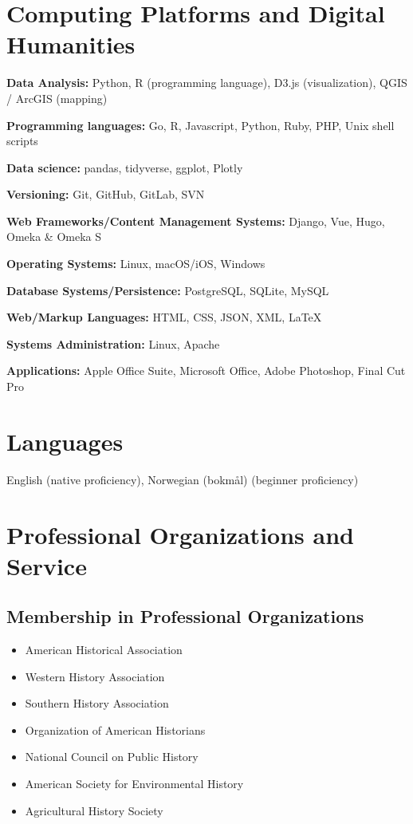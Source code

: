 \documentclass[10pt]{article}
\begin{document}
\section{Computing Platforms and Digital Humanities}

\textbf{Data Analysis:} Python, R (programming language), D3.js (visualization), QGIS / ArcGIS (mapping)

\textbf{Programming languages:} Go, R, Javascript, Python, Ruby, PHP, Unix shell scripts

\textbf{Data science:} pandas, tidyverse, ggplot, Plotly

\textbf{Versioning:} Git, GitHub, GitLab, SVN

\textbf{Web Frameworks/Content Management Systems:} Django, Vue, Hugo, Omeka \& Omeka S

\textbf{Operating Systems:} Linux, macOS/iOS, Windows

\textbf{Database Systems/Persistence:} PostgreSQL, SQLite, MySQL

\textbf{Web/Markup Languages:} HTML, CSS, JSON, XML, \LaTeX

\textbf{Systems Administration:} Linux, Apache

\textbf{Applications:} Apple Office Suite, Microsoft Office, Adobe Photoshop, Final Cut Pro

\section{Languages}
English (native proficiency), Norwegian (bokmål) (beginner proficiency)

\section{Professional Organizations and Service}

\subsection*{Membership in Professional Organizations}

\begin{itemize}
  \item American Historical Association
  \item Western History Association
  \item Southern History Association
  \item Organization of American Historians
  \item National Council on Public History
  \item American Society for Environmental History
  \item Agricultural History Society
\end{itemize}
\end{document}
